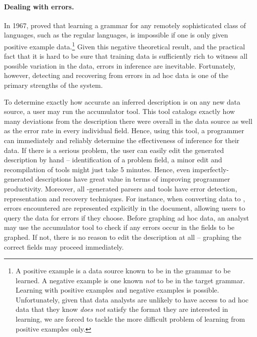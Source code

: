 
\paragraph*{Dealing with errors.}  
In 1967, \citet{gold:inference}
proved that learning a grammar for any remotely
sophisticated class of languages, such as the regular languages, 
is impossible if one is only given positive 
example data.\footnote{A positive example is a data source
known to be in the grammar to be learned.  
A negative example is one known {\em not} to be in the target grammar.
Learning with positive examples and negative examples is possible.
Unfortunately, given that data analysts are unlikely to have access to
ad hoc data that they know {\em does not} 
satisfy the format they are interested in learning,
we are forced to tackle the more difficult problem of learning from 
positive examples only.}
Given this negative theoretical result, and the practical fact
that it is hard to be sure that training data
is sufficiently rich to witness all possible variation in the data,
errors in inference are inevitable.  Fortunately, however, detecting
and recovering from errors in ad hoc data is one of the primary strengths
of the \pads{} system.  

To determine exactly how accurate an
inferred description is on any new data source, a user may run the
accumulator tool.  This tool catalogs exactly how many deviations
from the description there were overall in the data source
as well as the error rate in every individual field.
Hence, using this tool, a programmer can immediately and reliably
determine the effectiveness of inference for their data.
If there is a serious 
problem, the user can easily edit the generated description by hand
-- identification of a problem field, a minor
edit and recompilation of tools might just take 5 minutes.  Hence,
even imperfectly-generated descriptions have great value in terms of
improving programmer productivity.  Moreover, all \pads{}-generated 
parsers and tools
have error detection, representation and recovery techniques.
For instance, when converting data to \xml{}, errors encountered
are represented explicitly in the \xml{} document, allowing users to query
the data for errors if they choose.  Before graphing ad hoc data,
an analyst may use the accumulator tool to check if any errors occur
in the fields to be graphed.  If not, there is no reason to edit
the description at all -- graphing the correct fields may proceed 
immediately.

